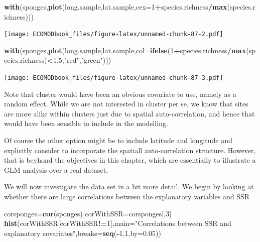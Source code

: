 \documentclass[
]{book}
\newenvironment{Shaded}{\begin{snugshade}}{\end{snugshade}}
\newcommand{\AttributeTok}[1]{\textcolor[rgb]{0.13,0.29,0.53}{#1}}
\newcommand{\DecValTok}[1]{\textcolor[rgb]{0.00,0.00,0.81}{#1}}
\newcommand{\FloatTok}[1]{\textcolor[rgb]{0.00,0.00,0.81}{#1}}
\newcommand{\FunctionTok}[1]{\textcolor[rgb]{0.13,0.29,0.53}{\textbf{#1}}}
\newcommand{\NormalTok}[1]{#1}
\newcommand{\OtherTok}[1]{\textcolor[rgb]{0.56,0.35,0.01}{#1}}
\newcommand{\SpecialCharTok}[1]{\textcolor[rgb]{0.81,0.36,0.00}{\textbf{#1}}}
\newcommand{\StringTok}[1]{\textcolor[rgb]{0.31,0.60,0.02}{#1}}
\begin{document}
\begin{Shaded}
\begin{Highlighting}[]
\FunctionTok{with}\NormalTok{(sponges,}\FunctionTok{plot}\NormalTok{(long.sample,lat.sample,}\AttributeTok{cex=}\DecValTok{1}\SpecialCharTok{+}\NormalTok{species.richness}\SpecialCharTok{/}\FunctionTok{max}\NormalTok{(species.richness))) }
\end{Highlighting}
\end{Shaded}

\texttt{[image: ECOMODbook\_files/figure-latex/unnamed-chunk-87-2.pdf]}

\begin{Shaded}
\begin{Highlighting}[]
\FunctionTok{with}\NormalTok{(sponges,}\FunctionTok{plot}\NormalTok{(long.sample,lat.sample,}\AttributeTok{col=}\FunctionTok{ifelse}\NormalTok{(}\DecValTok{1}\SpecialCharTok{+}\NormalTok{species.richness}\SpecialCharTok{/}\FunctionTok{max}\NormalTok{(species.richness)}\SpecialCharTok{\textless{}}\FloatTok{1.5}\NormalTok{,}\StringTok{"red"}\NormalTok{,}\StringTok{"green"}\NormalTok{))) }
\end{Highlighting}
\end{Shaded}

\texttt{[image: ECOMODbook\_files/figure-latex/unnamed-chunk-87-3.pdf]}

Note that cluster would have been an obvious covariate to use, namely as a random effect. While we are not interested in cluster per se, we know that sites are more alike within clusters just due to spatial auto-correlation, and hence that would have been sensible to include in the modelling.

Of course the other option might be to include latitude and longitude and explicitly consider to incorporate the spatiall auto-correlation structure. However, that is beyhond the objectives in this chapter, which are essentially to illustrate a GLM analysis over a real dataset.

We will now investigate the data set in a bit more detail. We begin by looking at whether there are large correlations between the explanatory variables and SSR

\begin{Shaded}
\begin{Highlighting}[]
\NormalTok{corsponges}\OtherTok{=}\FunctionTok{cor}\NormalTok{(sponges)}
\NormalTok{corWithSSR}\OtherTok{=}\NormalTok{corsponges[,}\DecValTok{3}\NormalTok{]}
\FunctionTok{hist}\NormalTok{(corWithSSR[corWithSSR}\SpecialCharTok{!=}\DecValTok{1}\NormalTok{],}\AttributeTok{main=}\StringTok{"Correlations between SSR and explanatory covariates"}\NormalTok{,}\AttributeTok{breaks=}\FunctionTok{seq}\NormalTok{(}\SpecialCharTok{{-}}\DecValTok{1}\NormalTok{,}\DecValTok{1}\NormalTok{,}\AttributeTok{by=}\FloatTok{0.05}\NormalTok{))}
\end{Highlighting}
\end{Shaded}
\end{document}
